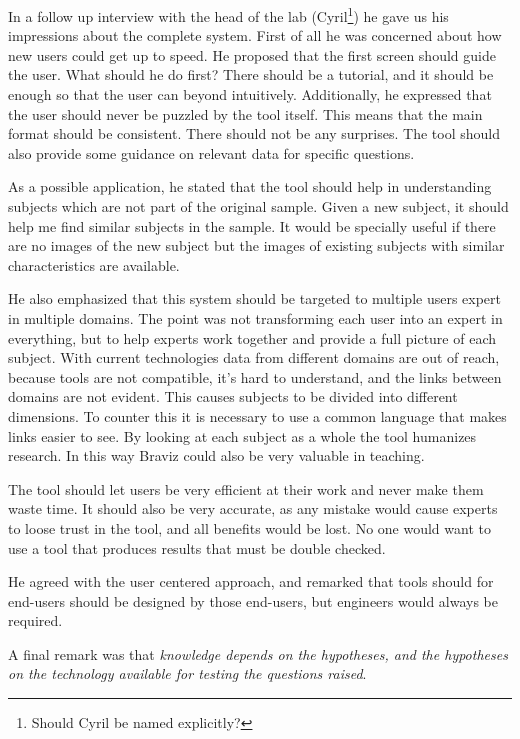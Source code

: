 
In a follow up interview with the head of the lab (Cyril\footnote{Should Cyril be named explicitly?}) he gave us his impressions about the complete system. First of all he was concerned about how new users could get up to speed. He proposed that the first screen should guide the user. What should he do first? There should be a tutorial, and it should be enough so that the user can beyond intuitively. Additionally, he expressed that the user should never be puzzled by the tool itself. This means that the main format should be consistent. There should not be any surprises. The tool should also provide some guidance on relevant data for specific questions. 

As a possible application, he stated that the tool should help in understanding subjects which are not part of the original sample. Given a new subject, it should help me find similar subjects in the sample. It would be specially useful if there are no images of the new subject but the images of existing subjects with similar characteristics are available. 

He also emphasized that this system should be targeted to multiple users expert in multiple domains. The point was not transforming each user into an expert in everything, but to help experts work together and provide a full picture of each subject. With current technologies data from different domains are out of reach, because tools are not compatible, it's hard to understand, and the links between domains are not evident. This causes subjects to be divided into different dimensions. To counter this it is necessary to use a common language that makes links easier to see. By looking at each subject as a whole the tool humanizes research. In this way Braviz could also be very valuable in teaching. 

The tool should let users be very efficient at their work and never make them waste time. It should also be very accurate, as any mistake would cause experts to loose trust in the tool, and all benefits would be lost. No one would want to use a tool that produces results that must be double checked.

He agreed with the user centered approach, and remarked that tools should for end-users should be designed by those end-users, but engineers would always be required.

A final remark was that \emph{knowledge depends on the hypotheses, and the hypotheses on the technology available for testing the questions raised}. 


